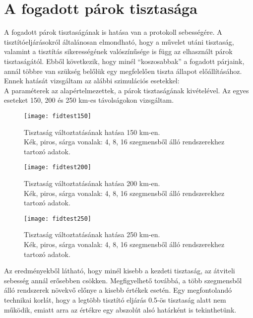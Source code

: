 \section{A fogadott párok tisztasága}
A fogadott párok tisztaságának is hatása van a protokoll sebességére. A tisztítóeljárásokról általánosan elmondható, hogy a művelet utáni tisztaság, valamint a tisztítás sikerességének valószínűsége is függ az elhasznált párok tisztaságától. Ebből következik, hogy minél ``koszosabbak'' a fogadott párjaink, annál többre van szükség belőlük egy megfelelően tiszta állapot előállításához. Ennek hatását vizsgáltam az alábbi szimulációs esetekkel:\\
A paraméterek az alapértelmezettek, a párok tisztaságának kivételével. Az egyes eseteket 150, 200 és 250 km-es távolságokon vizsgáltam.
\begin{figure}[H]
\centering
\texttt{[image: fidtest150]}
\caption[Tisztaság hatása 150]
{Tisztaság változtatásának hatása 150 km-en.\\ 
Kék, piros, sárga vonalak: 4, 8, 16 szegmensből álló rendszerekhez tartozó adatok.\\}
\end{figure}
\begin{figure}[H]
\centering
\texttt{[image: fidtest200]}
\caption[Tisztaság hatása 200]
{Tisztaság változtatásának hatása 200 km-en.\\ 
Kék, piros, sárga vonalak: 4, 8, 16 szegmensből álló rendszerekhez tartozó adatok.\\}
\end{figure}
\begin{figure}[H]
\centering
\texttt{[image: fidtest250]}
\caption[Tisztaság hatása 250]
{Tisztaság változtatásának hatása 250 km-en.\\ 
Kék, piros, sárga vonalak: 4, 8, 16 szegmensből álló rendszerekhez tartozó adatok.\\}
\end{figure}
Az eredményekből látható, hogy minél kisebb a kezdeti tisztaság, az átviteli sebesség annál erősebben csökken. Megfigyelhető továbbá, a több szegmensből álló rendszerek növekvő előnye a kisebb értékek esetén. Egy megfontolandó technikai korlát, hogy a legtöbb tisztító eljárás 0.5-ös tisztaság alatt nem működik, emiatt arra az értékre egy abszolút alsó határként is tekinthetünk.

